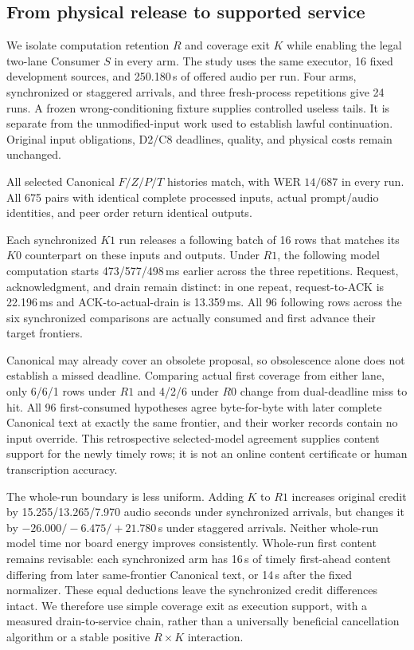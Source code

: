 \subsection{From physical release to supported service}
\label{subsec:release_evidence}
We isolate computation retention $R$ and coverage exit $K$ while enabling
the legal two-lane Consumer $S$ in every arm. The study uses the same
executor, 16 fixed development sources, and 250.180\,s of offered audio per
run. Four arms, synchronized or staggered arrivals, and three fresh-process
repetitions give 24 runs. A frozen wrong-conditioning fixture supplies
controlled useless tails. It is separate from the unmodified-input work
used to establish lawful continuation. Original input obligations, D2/C8
deadlines, quality, and physical costs remain unchanged.

All selected Canonical $F/Z/P/T$ histories match, with WER $14/687$ in
every run. All 675 pairs with identical complete processed inputs,
actual prompt/audio identities, and peer order return identical outputs.

Each synchronized $K1$ run releases a following batch of 16 rows that
matches its $K0$ counterpart on these inputs and outputs. Under $R1$, the
following model computation starts 473/577/498\,ms earlier across the three
repetitions. Request, acknowledgment, and drain remain distinct: in one
repeat, request-to-ACK is 22.196\,ms and ACK-to-actual-drain is 13.359\,ms.
All 96 following rows across the six synchronized comparisons are actually
consumed and first advance their target frontiers.

Canonical may already cover an obsolete proposal, so obsolescence alone
does not establish a missed deadline. Comparing actual first coverage
from either lane, only 6/6/1 rows under $R1$ and 4/2/6 under $R0$ change
from dual-deadline miss to hit. All 96 first-consumed hypotheses agree
byte-for-byte with later complete Canonical text at exactly the same
frontier, and their worker records contain no input override. This
retrospective selected-model agreement supplies content support for the
newly timely rows; it is not an online content certificate or human
transcription accuracy.

The whole-run boundary is less uniform. Adding $K$ to $R1$ increases
original credit by 15.255/13.265/7.970 audio seconds under synchronized
arrivals, but changes it by $-26.000/-6.475/+21.780$\,s under staggered
arrivals. Neither whole-run model time nor board energy improves
consistently. Whole-run first content remains revisable: each synchronized
arm has 16\,s of timely first-ahead content differing from later
same-frontier Canonical text, or 14\,s after the fixed normalizer. These
equal deductions leave the synchronized credit differences intact.
We therefore use simple coverage exit as execution support, with a
measured drain-to-service chain, rather than a universally beneficial
cancellation algorithm or a stable positive $R\times K$ interaction.

